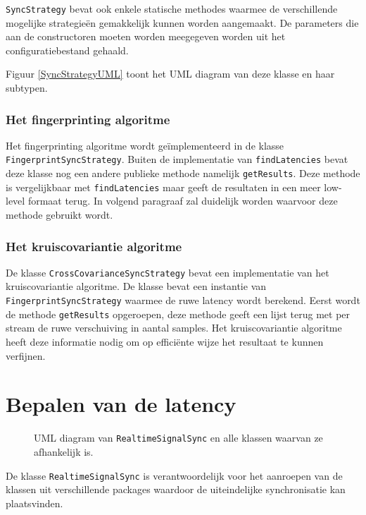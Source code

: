 \texttt{SyncStrategy} bevat ook enkele statische methodes waarmee de verschillende mogelijke strategieën gemakkelijk kunnen worden aangemaakt. De parameters die aan de constructoren moeten worden meegegeven worden uit het configuratiebestand gehaald.

Figuur \ref{SyncStrategyUML} toont het UML diagram van deze klasse en haar subtypen. 

\subsubsection{Het fingerprinting algoritme}
Het fingerprinting algoritme wordt geïmplementeerd in de klasse \texttt{FingerprintSyncStrategy}. Buiten de implementatie van \texttt{findLatencies} bevat deze klasse nog een andere publieke methode namelijk \texttt{getResults}. Deze methode is vergelijkbaar met \texttt{findLatencies} maar geeft de resultaten in een meer low-level formaat terug. In volgend paragraaf zal duidelijk worden waarvoor deze methode gebruikt wordt.

\subsubsection{Het kruiscovariantie algoritme}
De klasse \texttt{CrossCovarianceSyncStrategy} bevat een implementatie van het kruiscovariantie algoritme. De klasse bevat een instantie van \texttt{FingerprintSyncStrategy} waarmee de ruwe latency wordt berekend. Eerst wordt de methode \texttt{getResults} opgeroepen, deze methode geeft een lijst terug met per stream de ruwe verschuiving in aantal samples. Het kruiscovariantie algoritme heeft deze informatie nodig om op efficiënte wijze het resultaat te kunnen verfijnen.

\section*{Bepalen van de latency}

\begin{figure}[h!]
	\captionsetup{width=0.7\textwidth}
	\caption[UML diagram van \texttt{RealtimeSignalSync} + afhankelijkheden]{UML diagram van \texttt{RealtimeSignalSync} en alle klassen waarvan ze afhankelijk is.}
	\begin{center}
		\advance\parskip0.3cm
		
	\end{center}
	\label{latencyUML}
\end{figure}

De klasse \texttt{RealtimeSignalSync} is verantwoordelijk voor het aanroepen van de klassen uit verschillende packages waardoor de uiteindelijke synchronisatie kan plaatsvinden.

